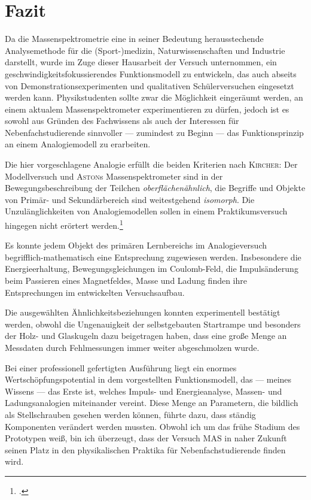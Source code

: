 \section{Fazit}

Da die Massenspektrometrie eine in seiner Bedeutung herausstechende Analysemethode für die (Sport-)medizin, Naturwissenschaften und Industrie  darstellt, wurde im Zuge dieser Hausarbeit der Versuch unternommen, ein geschwindigkeitsfokussierendes Funktionsmodell zu entwickeln, das auch abseits von Demonstrationsexperimenten und qualitativen Schülerversuchen eingesetzt werden kann. Physikstudenten sollte zwar die Möglichkeit eingeräumt werden, an einem aktualem Massenspektrometer experimentieren zu dürfen, jedoch ist es sowohl aus Gründen des Fachwissens als auch der Interessen für Nebenfachstudierende sinnvoller --- zumindest zu Beginn --- das Funktionsprinzip an einem Analogiemodell zu erarbeiten.

Die hier vorgeschlagene Analogie erfüllt die beiden Kriterien nach \textsc{Kircher}: Der Modellversuch und \textsc{Aston}s Massenspektrometer sind in der Bewegungsbeschreibung der Teilchen \textit{oberflächenähnlich}, die Begriffe und Objekte von Primär- und Sekundärbereich sind weitestgehend \textit{isomorph}. Die Unzulänglichkeiten von Analogiemodellen sollen in einem Praktikumsversuch hingegen nicht erörtert werden.\footcite[vgl.][S.\,128--129]{Kircher2013}  

Es konnte jedem Objekt des primären Lernbereichs im Analogieversuch begrifflich-mathematisch eine Entsprechung zugewiesen werden. Insbesondere die Energieerhaltung, Bewegungsgleichungen im Coulomb-Feld, die Impulsänderung beim Passieren eines Magnetfeldes, Masse und Ladung finden ihre Entsprechungen im entwickelten Versuchsaufbau.

Die ausgewählten Ähnlichkeitsbeziehungen konnten experimentell bestätigt werden, obwohl die Ungenauigkeit der selbstgebauten Startrampe und besonders der Holz- und Glaskugeln dazu beigetragen haben, dass eine große Menge an Messdaten durch Fehlmessungen immer weiter abgeschmolzen wurde. 

Bei einer professionell gefertigten Ausführung liegt ein enormes Wertschöpfungspotential in dem vorgestellten Funktionsmodell, das --- meines Wissens --- das Erste ist, welches Impuls- und Energieanalyse, Massen- und Ladungsanalogien miteinander vereint. Diese Menge an Parametern, die bildlich als Stellschrauben gesehen werden können, führte dazu, dass ständig Komponenten verändert werden mussten. Obwohl ich um das frühe Stadium des Prototypen weiß, bin ich überzeugt, dass der Versuch \textsc{MAS} in naher Zukunft seinen Platz in den physikalischen Praktika für Nebenfachstudierende finden wird.



